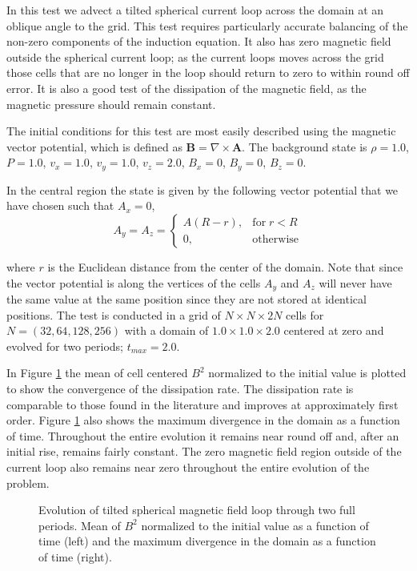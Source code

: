In this test we advect a tilted spherical current loop across the domain at an oblique angle to the grid. This test requires particularly accurate balancing of the non-zero components of the induction equation. It also has zero magnetic field outside the spherical current loop; as the current loops moves across the grid those cells that are no longer in the loop should return to zero to within round off error. It is also a good test of the dissipation of the magnetic field, as the magnetic pressure should remain constant.

The initial conditions for this test are most easily described using the magnetic vector potential, which is defined as $\boldsymbol{B} = \nabla \times\boldsymbol{A}$. The background state is
$\rho = 1.0$,
$P = 1.0$,
$v_x = 1.0$,
$v_y = 1.0$,
$v_z = 2.0$,
$B_x = 0$,
$B_y = 0$,
$B_z = 0$.

In the central region the state is given by the following vector potential that we have chosen such that $A_x = 0$,
\begin{equation}
    A_y = A_z = 
    \begin{cases}
        A \left( R - r \right),& \text{for}\; r < R\\
        0,              & \text{otherwise}
    \end{cases}
\end{equation}

where $r$ is the Euclidean distance from the center of the domain. Note that since the vector potential is along the vertices of the cells $A_y$ and $A_z$ will never have the same value at the same position since they are not stored at identical positions. The test is conducted in a grid of $N\times N\times 2N$ cells for $N=(32, 64, 128, 256)$ with a domain of $1.0\times1.0\times2.0$ centered at zero and evolved for two periods; $t_{max} = 2.0$.

In Figure \ref{fig:afl} the mean of cell centered $B^2$ normalized to the initial value is plotted to show the convergence of the dissipation rate. The dissipation rate is comparable to those found in the literature \citep{stone_athena_2008} and improves at approximately first order. Figure \ref{fig:afl} also shows the maximum divergence in the domain as a function of time. Throughout the entire evolution it remains near round off and, after an initial rise, remains fairly constant. The zero magnetic field region outside of the current loop also remains near zero throughout the entire evolution of the problem.
 
\begin{figure}[ht!]
    \caption{Evolution of tilted spherical magnetic field loop through two full periods. Mean of $B^2$ normalized to the initial value as a function of time (left) and the maximum divergence in the domain as a function of time (right). }
    \label{fig:afl}
\end{figure}


